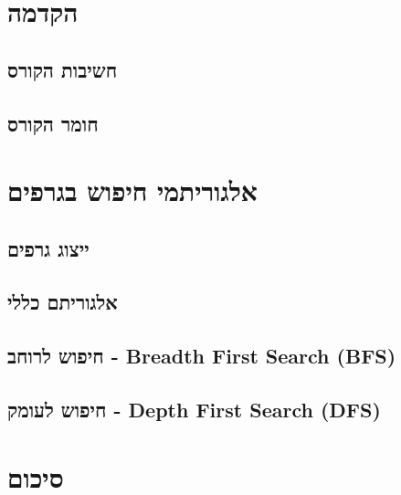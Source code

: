 \documentclass[]{article}
\def\insert#1{}
\begin{document}
\def\lecnum{1}
\def\topcis{
הקדמה, 
חיפוש בגרפים,
BFS
ו-%
DFS
}

\section*{הקדמה}
\insert{introduction}
	\subsection*{חשיבות הקורס}
	\insert{relevant}
	\subsection*{חומר הקורס}
	\insert{material}
\section*{אלגוריתמי חיפוש בגרפים}
	\insert{search}
	\subsection*{ייצוג גרפים}
	\insert{graph-representation}
	\subsection*{אלגוריתם כללי}
	\insert{general}
	\subsection*{חיפוש לרוחב - \textenglish{Breadth First Search (BFS)}}
	\insert{bfs}
	\subsection*{חיפוש לעומק - \textenglish{Depth First Search (DFS)}}
	\insert{dfs}
\section*{סיכום}
\insert{conclusion}
\end{document}
